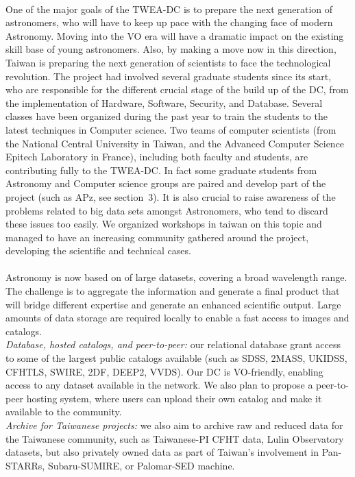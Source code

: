 \\
One of the major goals of the TWEA-DC is to prepare the next generation of astronomers, who will have to keep up pace with the changing face of modern Astronomy. Moving into the VO era will have a dramatic impact on the existing skill base of young astronomers. Also, by making a move now in this direction, Taiwan is preparing the next generation of scientists to face the technological revolution. The project had involved several graduate students since its start, who are responsible for the different crucial stage of the build up of the DC, from the implementation of Hardware, Software, Security, and Database. Several classes have been organized during the past year to train the students to the latest techniques in Computer science. Two teams of computer scientists (from the National Central University in Taiwan, and the Advanced Computer Science Epitech Laboratory in France), including both faculty and students, are contributing fully to the TWEA-DC. In fact some graduate students from Astronomy and Computer science groups are paired and develop part of the project (such as APz, see section~3).
It is also crucial to raise awareness of the problems related to big data sets amongst Astronomers, who tend to discard these issues too easily. We organized workshops in taiwan on this topic and managed to have an increasing community gathered around the project, developing the scientific and technical cases.\\

\\
Astronomy is now based on of large datasets, covering a broad wavelength range. The challenge is to aggregate the information and generate a final product that will bridge different expertise and generate an enhanced scientific output. Large amounts of data storage are required locally to enable a fast access to images and catalogs.  \\ 
{\it Database, hosted catalogs, and peer-to-peer:} our relational database grant access to some of the largest public catalogs available (such as SDSS, 2MASS, UKIDSS, CFHTLS, SWIRE, 2DF, DEEP2, VVDS). Our DC is VO-friendly, enabling access to any dataset available in the network. We also plan to propose a peer-to-peer hosting system, where users can upload their own catalog and make it available to the community.\\
{\it Archive for Taiwanese projects:} we also aim to archive raw and reduced data for the Taiwanese community, such as Taiwanese-PI CFHT data, Lulin Observatory datasets, but also privately owned data as part of Taiwan's involvement in Pan-STARRs, Subaru-SUMIRE, or Palomar-SED machine.\\

